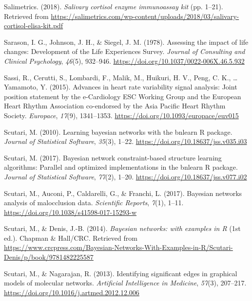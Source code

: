 \documentclass[
  english,
  man,floatsintext]{apa6}
\begin{document}
\leavevmode\hypertarget{ref-Salimetrics2018}{}%
Salimetrics. (2018). \emph{Salivary cortisol enzyme immunoassay kit} (pp. 1--21). Retrieved from \url{https://salimetrics.com/wp-content/uploads/2018/03/salivary-cortisol-elisa-kit.pdf}

\leavevmode\hypertarget{ref-Sarason1978}{}%
Sarason, I. G., Johnson, J. H., \& Siegel, J. M. (1978). Assessing the impact of life changes: Development of the Life Experiences Survey. \emph{Journal of Consulting and Clinical Psychology}, \emph{46}(5), 932--946. \url{https://doi.org/10.1037/0022-006X.46.5.932}

\leavevmode\hypertarget{ref-Sassi2015}{}%
Sassi, R., Cerutti, S., Lombardi, F., Malik, M., Huikuri, H. V., Peng, C. K., \ldots{} Yamamoto, Y. (2015). Advances in heart rate variability signal analysis: Joint position statement by the e-Cardiology ESC Working Group and the European Heart Rhythm Association co-endorsed by the Asia Pacific Heart Rhythm Society. \emph{Europace}, \emph{17}(9), 1341--1353. \url{https://doi.org/10.1093/europace/euv015}

\leavevmode\hypertarget{ref-R-bnlearn_b}{}%
Scutari, M. (2010). Learning bayesian networks with the bnlearn R package. \emph{Journal of Statistical Software}, \emph{35}(3), 1--22. \url{https://doi.org/10.18637/jss.v035.i03}

\leavevmode\hypertarget{ref-R-bnlearn_a}{}%
Scutari, M. (2017). Bayesian network constraint-based structure learning algorithms: Parallel and optimized implementations in the bnlearn R package. \emph{Journal of Statistical Software}, \emph{77}(2), 1--20. \url{https://doi.org/10.18637/jss.v077.i02}

\leavevmode\hypertarget{ref-Scutari2017}{}%
Scutari, M., Auconi, P., Caldarelli, G., \& Franchi, L. (2017). Bayesian networks analysis of malocclusion data. \emph{Scientific Reports}, \emph{7}(1), 1--11. \url{https://doi.org/10.1038/s41598-017-15293-w}

\leavevmode\hypertarget{ref-Scutari2014}{}%
Scutari, M., \& Denis, J.-B. (2014). \emph{Bayesian networks: with examples in R} (1st ed.). Chapman \& Hall/CRC. Retrieved from \url{https://www.crcpress.com/Bayesian-Networks-With-Examples-in-R/Scutari-Denis/p/book/9781482225587}

\leavevmode\hypertarget{ref-Scutari2013}{}%
Scutari, M., \& Nagarajan, R. (2013). Identifying significant edges in graphical models of molecular networks. \emph{Artificial Intelligence in Medicine}, \emph{57}(3), 207--217. \url{https://doi.org/10.1016/j.artmed.2012.12.006}
\end{document}

